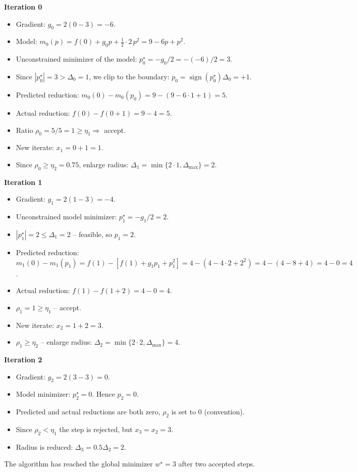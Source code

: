 \documentclass{article}
\begin{document}
\bigskip
\noindent\textbf{Iteration 0}
\begin{itemize}
\item Gradient: \(g_{0}=2(0-3)=-6\).
\item Model: \(m_{0}(p)=f(0)+g_{0}p+\tfrac12\cdot2\,p^{2}=9-6p+p^{2}\).
\item Unconstrained minimizer of the model:
\(p^{\star}_{0}=-g_{0}/2=-(-6)/2=3\).
\item Since \(|p^{\star}_{0}|=3>\Delta_{0}=1\), we clip to the boundary:
\(p_{0}= \operatorname{sign}(p^{\star}_{0})\Delta_{0}=+1\).
\item Predicted reduction:
\(m_{0}(0)-m_{0}(p_{0}) = 9-(9-6\cdot1+1)=5\).
\item Actual reduction:
\(f(0)-f(0+1)=9-4=5\).
\item Ratio \(\rho_{0}=5/5=1\ge\eta_{1}\Rightarrow\) accept.
\item New iterate: \(x_{1}=0+1=1\).
\item Since \(\rho_{0}\ge\eta_{2}=0.75\), enlarge radius:
\(\Delta_{1}=\min\{2\cdot1,\Delta_{\max}\}=2\).
\end{itemize}

\bigskip
\noindent\textbf{Iteration 1}
\begin{itemize}
\item Gradient: \(g_{1}=2(1-3)=-4\).
\item Unconstrained model minimizer: \(p^{\star}_{1}= -g_{1}/2=2\).
\item \(|p^{\star}_{1}|=2\le\Delta_{1}=2\) – feasible, so \(p_{1}=2\).
\item Predicted reduction:
\(m_{1}(0)-m_{1}(p_{1}) = f(1)-[f(1)+g_{1}p_{1}+p_{1}^{2}]
=4- (4-4\cdot2+2^{2})=4-(4-8+4)=4-0=4\).
\item Actual reduction:
\(f(1)-f(1+2)=4-0=4\).
\item \(\rho_{1}=1\ge\eta_{1}\) – accept.
\item New iterate: \(x_{2}=1+2=3\).
\item \(\rho_{1}\ge\eta_{2}\) – enlarge radius:
\(\Delta_{2}= \min\{2\cdot2,\Delta_{\max}\}=4\).
\end{itemize}

\bigskip
\noindent\textbf{Iteration 2}
\begin{itemize}
\item Gradient: \(g_{2}=2(3-3)=0\).
\item Model minimizer: \(p^{\star}_{2}=0\). Hence \(p_{2}=0\).
\item Predicted and actual reductions are both zero,
\(\rho_{2}\) is set to \(0\) (convention).
\item Since \(\rho_{2}<\eta_{1}\) the step is rejected, but \(x_{3}=x_{2}=3\).
\item Radius is reduced: \(\Delta_{3}=0.5\Delta_{2}=2\).
\end{itemize}
The algorithm has reached the global minimizer \(w^{\star}=3\) after
two accepted steps.
\end{document}

